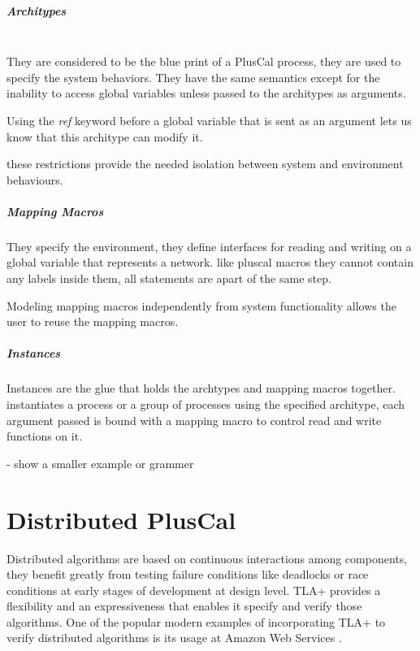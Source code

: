 \documentclass{thesul}
\begin{document}
\paragraph{\textbf{Architypes}}
\hfill\\
They are considered to be the blue print of a PlusCal process, they are used to specify the system behaviors. They have the same semantics except for the inability to access global variables unless passed to the architypes as arguments.

Using the \textit{ref} keyword before a global variable that is sent as an argument lets us know that this architype can modify it.

these restrictions provide the needed isolation between system and environment behaviours.

\paragraph{Mapping Macros}

They specify the environment, they define interfaces for reading and writing on a global variable that represents a network.
like pluscal macros they cannot contain any labels inside them, all statements are apart of the same step.

Modeling mapping macros independently from system functionality allows the user to reuse the mapping macros.

\paragraph{Instances}

Instances are the glue that holds the archtypes and mapping macros together.
instantiates a process or a group of processes using the specified architype, each argument passed is bound with a mapping macro to control read and write functions on it.

- show a smaller example or grammer

\chapter{Distributed PlusCal}


Distributed algorithms are based on continuous interactions among components, they benefit greatly from testing failure conditions like deadlocks or race conditions at early stages of development at design level.
TLA+ provides a flexibility and an expressiveness that enables it specify and verify those algorithms. One of the popular modern examples of incorporating TLA+ to verify distributed algorithms is its usage at Amazon Web Services \cite{amazon}.
\end{document}
